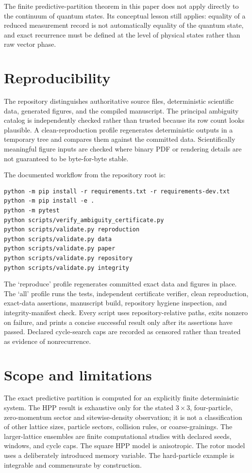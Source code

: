 \documentclass[11pt]{article}
\begin{document}
The finite predictive-partition theorem in this paper does not apply directly to
the continuum of quantum states. Its conceptual lesson still applies: equality
of a reduced measurement record is not automatically equality of the quantum
state, and exact recurrence must be defined at the level of physical states rather
than raw vector phase.

\section{Reproducibility}

The repository distinguishes authoritative source files, deterministic scientific
data, generated figures, and the compiled manuscript. The principal ambiguity
catalog is independently checked rather than trusted because its row count looks
plausible. A clean-reproduction profile regenerates deterministic outputs in a
temporary tree and compares them against the committed data. Scientifically
meaningful figure inputs are checked where binary PDF or rendering details are
not guaranteed to be byte-for-byte stable.

The documented workflow from the repository root is:
\begin{verbatim}
python -m pip install -r requirements.txt -r requirements-dev.txt
python -m pip install -e .
python -m pytest
python scripts/verify_ambiguity_certificate.py
python scripts/validate.py reproduction
python scripts/validate.py data
python scripts/validate.py paper
python scripts/validate.py repository
python scripts/validate.py integrity
\end{verbatim}

The `reproduce' profile regenerates committed exact data and figures in place. The
`all' profile runs the tests, independent certificate verifier, clean reproduction,
exact-data assertions, manuscript build, repository hygiene inspection, and
integrity-manifest check. Every script uses repository-relative paths, exits
nonzero on failure, and prints a concise successful result only after its
assertions have passed. Declared cycle-search caps are recorded as censored rather
than treated as evidence of nonrecurrence.

\section{Scope and limitations}

The exact predictive partition is computed for an explicitly finite deterministic
system. The HPP result is exhaustive only for the stated $3\times3$,
four-particle, zero-momentum sector and sitewise-density observation; it is not a
classification of other lattice sizes, particle sectors, collision rules, or
coarse-grainings. The larger-lattice ensembles are finite computational studies
with declared seeds, windows, and cycle caps. The square HPP model is anisotropic.
The rotor model uses a deliberately introduced memory variable. The hard-particle
example is integrable and commensurate by construction.
\end{document}
